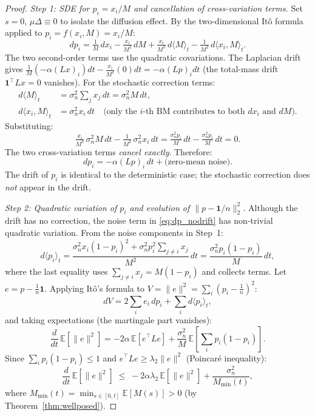 \documentclass[review,12pt]{elsarticle}
\newcommand{\lambdat}{\lambda_2}
\begin{document}
\begin{proof}
\emph{Step 1: SDE for $p_i = x_i/M$ and cancellation of cross-variation terms.}
Set $s=0$, $\mu\Delta\equiv 0$ to isolate the diffusion effect.
By the two-dimensional Itô formula applied to $p_i = f(x_i, M) = x_i/M$:
\[
  dp_i
  = \tfrac{1}{M}\,dx_i
    - \tfrac{x_i}{M^2}\,dM
    + \tfrac{x_i}{M^3}\,d\langle M\rangle_t
    - \tfrac{1}{M^2}\,d\langle x_i, M\rangle_t.
\]
The two second-order terms use the quadratic covariations.
The Laplacian drift gives $\tfrac{1}{M}(-\alpha(Lx)_i)dt - \tfrac{x_i}{M^2}(0)dt = -\alpha(Lp)_i dt$
(the total-mass drift $\mathbf{1}^\top Lx = 0$ vanishes).
For the stochastic correction terms:
\begin{align*}
  d\langle M\rangle_t &= \sigma_n^2\sum_j x_j\,dt = \sigma_n^2 M\,dt, \\
  d\langle x_i, M\rangle_t &= \sigma_n^2 x_i\,dt
    \quad\text{(only the $i$-th BM contributes to both $dx_i$ and $dM$)}.
\end{align*}
Substituting:
\[
  \tfrac{x_i}{M^3}\,\sigma_n^2 M\,dt - \tfrac{1}{M^2}\,\sigma_n^2 x_i\,dt
  = \tfrac{\sigma_n^2 p_i}{M}\,dt - \tfrac{\sigma_n^2 p_i}{M}\,dt = 0.
\]
The two cross-variation terms \emph{cancel exactly}.  Therefore:
\begin{equation}
  dp_i = -\alpha(Lp)_i\,dt + \text{(zero-mean noise)}.
  \label{eq:dp_nodrift}
\end{equation}
The drift of $p_i$ is identical to the deterministic case; the stochastic
correction does \emph{not} appear in the drift.

\emph{Step 2: Quadratic variation of $p_i$ and evolution of $\|p - \mathbf{1}/n\|_2^2$.}
Although the drift has no correction, the noise term in \eqref{eq:dp_nodrift}
has non-trivial quadratic variation.  From the noise components in Step~1:
\[
  d\langle p_i\rangle_t
  = \frac{\sigma_n^2 x_i(1-p_i)^2 + \sigma_n^2 p_i^2\sum_{j\neq i}x_j}{M^2}\,dt
  = \frac{\sigma_n^2 p_i(1-p_i)}{M}\,dt,
\]
where the last equality uses $\sum_{j\neq i}x_j = M(1-p_i)$ and collects
terms.  Let $e = p - \tfrac{1}{n}\mathbf{1}$.
Applying Itô's formula to $V = \|e\|^2 = \sum_i(p_i-\tfrac{1}{n})^2$:
\[
  dV = 2\sum_i e_i\,dp_i + \sum_i d\langle p_i\rangle_t,
\]
and taking expectations (the martingale part vanishes):
\[
  \frac{d}{dt}\,\mathbb{E}[\|e\|^2]
  = -2\alpha\,\mathbb{E}[e^\top Le]
    + \frac{\sigma_n^2}{M}\,\mathbb{E}\!\left[\sum_i p_i(1-p_i)\right].
\]
Since $\sum_i p_i(1-p_i) \leq 1$ and $e^\top Le \geq \lambdat\|e\|^2$
(Poincaré inequality):
\[
  \frac{d}{dt}\,\mathbb{E}[\|e\|^2]
  \;\leq\; -2\alpha\lambdat\,\mathbb{E}[\|e\|^2]
           + \frac{\sigma_n^2}{M_{\min}(t)},
\]
where $M_{\min}(t) = \min_{s\in[0,t]}\mathbb{E}[M(s)] > 0$
(by Theorem~\ref{thm:wellposed}).


\end{proof}
\end{document}
